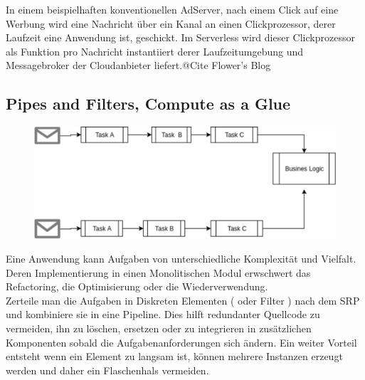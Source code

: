 \documentclass[
12pt,
english,
ngerman,
headsepline,
twoside,
openright,
numbers=noenddot,version=first
]{scrreprt}
\begin{document}
In einem beispielhaften konventionellen AdServer, nach einem Click auf eine Werbung wird eine Nachricht über ein Kanal an einen Clickprozessor, derer Laufzeit eine Anwendung ist, geschickt. Im Serverless wird dieser Clickprozessor als Funktion pro Nachricht instantiiert derer Laufzeitumgebung und Messagebroker der Cloudanbieter liefert.@Cite Flower's Blog


\subsection{Pipes and Filters, Compute as a Glue}
\label{sec:pipes-filters}
\begin{figure}
	\includegraphics[width=0.9\linewidth]{./pics/pipes-and-filters.eps}
\end{figure}
Eine Anwendung kann Aufgaben von unterschiedliche Komplexität und Vielfalt. Deren Implementierung in einen Monolitischen Modul erwschwert das Refactoring, die Optimisierung oder die Wiederverwendung. \\
Zerteile man die Aufgaben in Diskreten Elementen ( oder Filter ) nach dem \acrshort{SRP} und kombiniere sie in eine Pipeline. Dies hilft redundanter Quellcode zu vermeiden, ihn zu löschen, ersetzen oder zu integrieren in zusätzlichen Komponenten sobald die Aufgabenanforderungen sich ändern\cite{patternsCloud}. Ein weiter Vorteil entsteht wenn ein Element zu langsam ist, können mehrere Instanzen erzeugt werden und daher ein Flaschenhals vermeiden.
\end{document}

